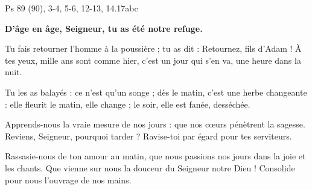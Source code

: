 Ps 89 (90), 3-4, 5-6, 12-13, 14.17abc

\textbf{D’âge en âge, Seigneur, tu as été notre refuge.}

\smallskip

Tu fais retourner l’homme à la poussière ;
tu as dit : \og Retournez, fils d’Adam ! \fg
À tes yeux, mille ans sont comme hier,
c’est un jour qui s’en va, une heure dans la nuit.

\smallskip

Tu les as balayés : ce n’est qu’un songe ;
dès le matin, c’est une herbe changeante :
elle fleurit le matin, elle change ;
le soir, elle est fanée, desséchée.

\smallskip

Apprends-nous la vraie mesure de nos jours :
que nos cœurs pénètrent la sagesse.
Reviens, Seigneur, pourquoi tarder ?
Ravise-toi par égard pour tes serviteurs.

\smallskip

Rassasie-nous de ton amour au matin,
que nous passions nos jours dans la joie et les chants.
Que vienne sur nous la douceur du Seigneur notre Dieu !
Consolide pour nous l’ouvrage de nos mains.

